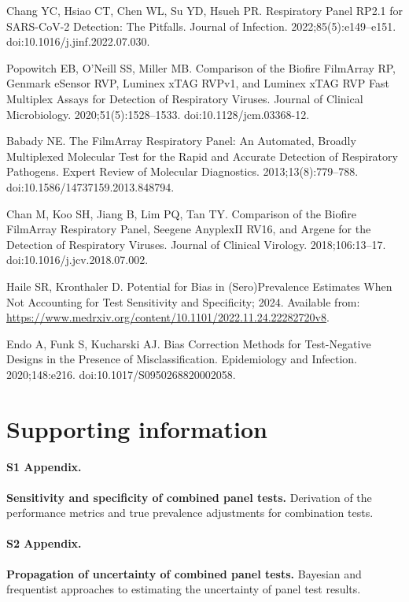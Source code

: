 \documentclass[10pt,letterpaper]{article}
\begin{document}
\begin{thebibliography}{10}
Chang YC, Hsiao CT, Chen WL, Su YD, Hsueh PR.
 Respiratory Panel {{RP2}}.1 for {{SARS-CoV-2}}
  Detection: {{The}} Pitfalls.
\newblock Journal of Infection. 2022;85(5):e149--e151.
\newblock doi:{10.1016/j.jinf.2022.07.030}.

Popowitch EB, O'Neill SS, Miller MB.
\newblock Comparison of the {{Biofire FilmArray RP}}, {{Genmark eSensor RVP}},
  {{Luminex xTAG RVPv1}}, and {{Luminex xTAG RVP Fast Multiplex Assays}} for
  {{Detection}} of {{Respiratory Viruses}}.
\newblock Journal of Clinical Microbiology. 2020;51(5):1528--1533.
\newblock doi:{10.1128/jcm.03368-12}.

Babady NE.
\newblock The {{FilmArray}} Respiratory Panel: An Automated, Broadly
  Multiplexed Molecular Test for the Rapid and Accurate Detection of
  Respiratory Pathogens.
\newblock Expert Review of Molecular Diagnostics. 2013;13(8):779--788.
\newblock doi:{10.1586/14737159.2013.848794}.

Chan M, Koo SH, Jiang B, Lim PQ, Tan TY.
\newblock Comparison of the {{Biofire FilmArray Respiratory Panel}}, {{Seegene
  AnyplexII RV16}}, and {{Argene}} for the Detection of Respiratory Viruses.
\newblock Journal of Clinical Virology. 2018;106:13--17.
\newblock doi:{10.1016/j.jcv.2018.07.002}.

Haile SR, Kronthaler D. Potential for Bias in (Sero)Prevalence Estimates When
  Not Accounting for Test Sensitivity and Specificity; 2024.
\newblock Available from:
  \url{https://www.medrxiv.org/content/10.1101/2022.11.24.22282720v8}.

Endo A, Funk S, Kucharski AJ.
\newblock Bias Correction Methods for Test-Negative Designs in the Presence of
  Misclassification.
\newblock Epidemiology and Infection. 2020;148:e216.
\newblock doi:{10.1017/S0950268820002058}.

\end{thebibliography}

\section*{Supporting information}


\paragraph*{S1 Appendix.}
\label{S1_Appendix}
{\bf Sensitivity and specificity of combined panel tests.} Derivation of the performance metrics and true prevalence adjustments for combination tests.

\paragraph*{S2 Appendix.}
\label{S2_Appendix}
{\bf Propagation of uncertainty of combined panel tests.} Bayesian and frequentist approaches to estimating the uncertainty of panel test results.
\end{document}
